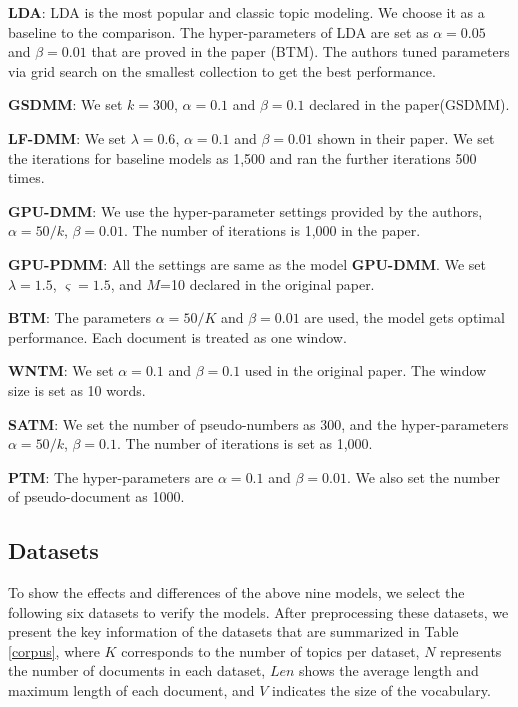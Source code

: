 \documentclass[10pt,journal,compsoc]{IEEEtran}
\begin{document}
{\textbf{LDA}: LDA is the most popular and classic topic modeling. We choose it as a baseline to the comparison. The hyper-parameters of LDA are set as $\alpha=0.05$ and $\beta=0.01$ that are proved in the paper (BTM). The authors tuned parameters via grid search on the smallest collection to get the best performance. 



\textbf{GSDMM}: We set $k=300$, $\alpha=0.1$ and $\beta=0.1$ declared in the paper(GSDMM).

\textbf{LF-DMM}: We set $\lambda=0.6$, $\alpha=0.1$ and $\beta=0.01$ shown in their paper. We set the iterations for baseline models as 1,500 and ran the further iterations 500 times.


\textbf{GPU-DMM}: We use the hyper-parameter settings provided by the authors, $\alpha=50/k$, $\beta=0.01$. The number of iterations is 1,000 in the paper.


\textbf{GPU-PDMM}: All the settings are same as the model \textbf{GPU-DMM}. We set $\lambda=1.5$, $\varsigma=1.5$, and $M$=10 declared in the original paper.

\textbf{BTM}: The parameters $\alpha =50/K$ and $\beta =0.01$ are used, the model gets optimal performance. Each document is treated as one window.

\textbf{WNTM}: We set $\alpha=0.1$ and $\beta=0.1$ used in the original paper. The window size is set as 10 words. 

\textbf{SATM}: We set the number of pseudo-numbers as 300, and the hyper-parameters $\alpha=50/k$, $\beta=0.1$. The number of iterations is set as 1,000.


\textbf{PTM}: The hyper-parameters are $\alpha=0.1$ and $\beta=0.01$. We also set the number of pseudo-document as 1000.


\subsection{Datasets}

To show the effects and differences of the above nine models, we select the following six datasets to verify the models. After preprocessing these datasets, we present the key information of the datasets that are summarized in Table \ref{corpus}, where $K$ corresponds to the number of topics per dataset, $N$ represents the number of documents in each dataset, $Len$ shows the average length and maximum length of each document, and $V$ indicates the size of the vocabulary.


}
\end{document}

